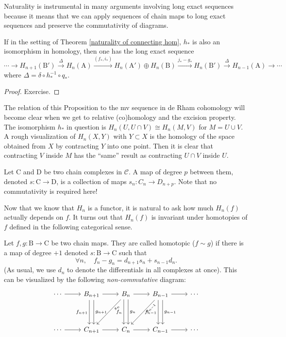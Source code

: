 \documentclass[english,letterpaper]{article}%
\numberwithin{equation}{section}
\numberwithin{figure}{section}
\numberwithin{table}{section}
\theoremstyle{definition}
\theoremstyle{definition}
\theoremstyle{definition}
\theoremstyle{plain}
\theoremstyle{plain}
\theoremstyle{plain}
\theoremstyle{plain}
\theoremstyle{remark}
\theoremstyle{remark}
\newcommand{\calC}{\mathcal{C}}
\newcommand{\bm}[1]{\boldsymbol{\mathrm{#1}}}
\begin{document}
Naturality is instrumental in many arguments involving long exact sequences because it means that we can apply sequences of chain maps to long exact sequences and preserve the commutativity of diagrams.

\begin{prop}
    If in the setting of Theorem \ref{naturality of connecting hom}, $h_\ast$ is also an isomorphism in homology, then one has the long exact sequence
    \[\cdots \to H_{n+1}(\bm{B}')\overset\Delta\to H_n(\bm{A})\overset{(f_\ast,i_\ast)}\longrightarrow H_n(\bm{A}')\oplus H_n(\bm{B})\overset{j_\ast- g_\ast}\longrightarrow H_n(\bm{B}')\overset{\Delta}\to H_{n-1}(\bm{A})\to \cdots\]
    where $\Delta=\delta \circ h_\ast^{-1}\circ q_\ast$.
\end{prop}
\begin{proof}
     Exercise.
\end{proof}

The relation of this Proposition to the \gls{mv} sequence in de Rham cohomology will become clear when we get to relative (co)homology and the excision property. The isomorphism $h_\ast$ in question is $H_n(U,U\cap V)\cong H_n(M,V)$ for $M=U\cup V$. A rough visualization of $H_n(X,Y)$ with $Y\subset X$ is the homology of the space obtained from $X$ by contracting $Y$ into one point. Then it is clear that contracting $V$ inside $M$ has the ``same'' result as contracting $U\cap V$ inside $U$. 


\begin{defn}
    Let $\bm{C}$ and $\bm{D}$ be two chain complexes in $\calC$. A map of degree $p$ between them, denoted $s:\bm{C}\to \bm{D}$, is a collection of maps $s_n:C_n\to D_{n+p}$. Note that no commutativity is required here!
\end{defn}


Now that we know that $H_n$ is a functor, it is natural to ask how much $H_n(f)$ actually depends on $f$. It turns out that $H_n(f)$ is invariant under homotopies of $f$ defined in the following categorical sense.


\begin{defn}
    Let $f,g:\bm{B}\to \bm{C}$ be two chain maps. They are called homotopic ($f\sim g$) if there is a map of degree $+1$ denoted $s:\bm{B}\to \bm{C}$ such that 
    \[\forall n,\quad f_n-g_n=d_{n+1}s_n+s_{n-1}d_n.\]
    (As usual, we use $d_n$ to denote the differentials in all complexes at once).
    This can be visualized by the following \emph{non-commutative} diagram:
     \[\begin{tikzcd}
        \cdots\ar[r] & B_{n+1}\ar[r]\ar[dd,swap, xshift=-.75ex,"f_{n+1}"]\ar[dd,xshift=.75ex,"g_{n+1}"] & B_{n} \arrow[r]\ar[dd,swap,xshift=-.75ex,"f_n"]\ar[dd,xshift=.75ex,"g_n"]\ar[ddl,swap,sloped, near start,"s_n"] & B_{n-1}\ar[dd,swap,xshift=-.75ex,"f_{n-1}"]\ar[dd,xshift=.75ex,"g_{n-1}"]\ar[r]\ar[ddl,swap, near start,sloped,"s_{n-1}"] & \cdots \\
        &&&&\\
       \cdots\ar[r] & C_{n+1}\ar[r] & C_n\ar[r] &C_{n-1} \ar[r] &\cdots
    \end{tikzcd}\]
\end{defn}
\end{document}
